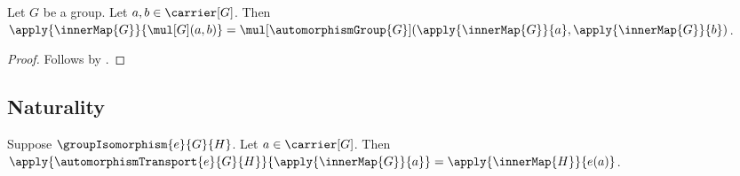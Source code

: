 \begin{proposition}\label{inner_map_mul}
    Let $G$ be a group.
    Let $a,b\in\carrier[G]$.
    Then
        $\apply{\innerMap{G}}{\mul[G](a,b)}=
            \mul[\automorphismGroup{G}](
                \apply{\innerMap{G}}{a},\apply{\innerMap{G}}{b})$.
\end{proposition}
\begin{proof}
    Follows by .
\end{proof}

\subsection{Naturality}

\begin{theorem}\label{automorphism_transport_inner_element}
    Suppose $\groupIsomorphism{e}{G}{H}$.
    Let $a\in\carrier[G]$.
    Then
        $\apply{\automorphismTransport{e}{G}{H}}{
            \apply{\innerMap{G}}{a}}=
            \apply{\innerMap{H}}{e(a)}$.
\end{theorem}
